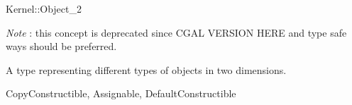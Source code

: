 \begin{ccRefConcept}{Kernel::Object_2}
\begin{ccDeprecated}
{\em Note} : this concept is deprecated since CGAL VERSION HERE and type safe ways should be preferred. 

A type representing different types of objects in two dimensions.

\ccRefines
CopyConstructible, Assignable, DefaultConstructible 

\ccSeeAlso
{} \\
\\
 \\
 \\
\end{ccDeprecated}
\end{ccRefConcept}
